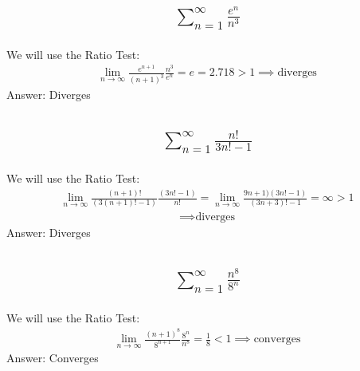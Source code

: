 \documentclass{article}
\begin{document}
\subsection{
	\begin{align*}
		\sum_{n = 1}^\infty \frac{e^n}{n^3}
	\end{align*}
}
We will use the Ratio Test:
\begin{align*}
	\lim_{n \to \infty} \frac{e^{n + 1}}{(n + 1)^3} \frac{n^3}{e^n} = e = 2.718 > 1 \implies \text{diverges}
\end{align*}
Answer: Diverges

\subsection{
	\begin{align*}
		\sum_{n = 1}^\infty \frac{n!}{3n! - 1}
	\end{align*}
}
We will use the Ratio Test:
\begin{align*}
	\lim_{n \to \infty} \frac{(n + 1)!}{(3(n + 1)! - 1)} \frac{(3n! - 1)}{n!} = \lim_{n \to \infty} \frac{9n + 1)(3n! - 1)}{(3n + 3)! - 1} = \infty > 1
\end{align*}
\begin{align*}
	\implies \text{diverges}
\end{align*}
Answer: Diverges

\subsection{
	\begin{align*}
		\sum_{n = 1}^\infty \frac{n^8}{8^n}
	\end{align*}
}
We will use the Ratio Test:
\begin{align*}
	\lim_{n \to \infty} \frac{(n + 1)^8}{8^{n + 1}} \frac{8^n}{n^8} = \frac{1}{8} < 1 \implies \text{converges}
\end{align*}
Answer: Converges

\end{document}
